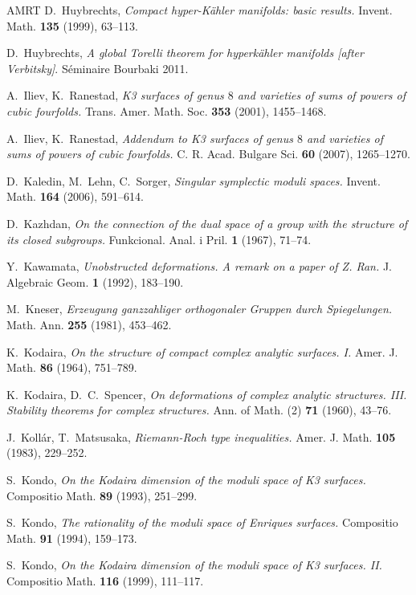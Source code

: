 \documentclass[a4paper,11pt]{article}
\begin{document}
\begin{thebibliography}{AMRT}
 D.~Huybrechts, {\it Compact hyper-K\"ahler
  manifolds: basic results.} Invent. Math. {\bf 135} (1999),
  63--113.

 D.~Huybrechts, {\it A global Torelli theorem for
hyperk\"ahler manifolds [after Verbitsky]}. S\'eminaire Bourbaki 2011.

 A.~Iliev, K.~Ranestad, {\it K3 surfaces of
  genus $8$ and varieties of sums of powers of cubic fourfolds.}
  Trans. Amer. Math. Soc. {\bf 353} (2001), 1455--1468.

 A.~Iliev, K.~Ranestad, {\it Addendum to K3
  surfaces of genus $8$ and varieties of sums of powers of cubic
  fourfolds.} C. R. Acad. Bulgare Sci. {\bf 60} (2007), 1265--1270.

 D.~Kaledin, M.~Lehn, C.~Sorger, {\it Singular
  symplectic moduli spaces.}  Invent. Math. {\bf 164} (2006),
  591--614.

 D.~Kazhdan, {\it On the connection of the dual space
  of a group with the structure of its closed subgroups.}
  Funkcional. Anal. i Pril.  {\bf 1} (1967), 71--74.

 Y.~Kawamata, {\it Unobstructed deformations. A
  remark on a paper of Z. Ran.}  J. Algebraic Geom. {\bf 1} (1992),
  183--190.

 M.~Kneser, {\it Erzeugung ganzzahliger orthogonaler
  Gruppen durch Spiegelungen.} Math. Ann. {\bf 255} (1981),
  453--462.

 K.~Kodaira, {\it On the structure of compact complex
  analytic surfaces. I.}  Amer. J. Math.  {\bf 86} (1964), 751--789.

 K.~Kodaira, D.~C.~Spencer, {\it On deformations of
  complex analytic structures. III. Stability theorems for complex
  structures.}  Ann. of Math. (2) {\bf 71} (1960), 43--76.

 J.~Koll\'ar, T.~Matsusaka, {\it Riemann-Roch type
  inequalities.}  Amer. J. Math. {\bf 105} (1983), 229--252.

 S.~Kondo, {\it On the Kodaira dimension of the
    moduli space of K3 surfaces.} Compositio Math. {\bf 89}
  (1993), 251--299.

 S.~Kondo, {\it The rationality of the moduli
  space of Enriques surfaces.}  Compositio Math. {\bf 91} (1994),
  159--173.

 S.~Kondo, {\it On the Kodaira dimension of the
  moduli space of K3 surfaces. II.} Compositio Math. {\bf
  116} (1999), 111--117.


\end{thebibliography}
\end{document}

